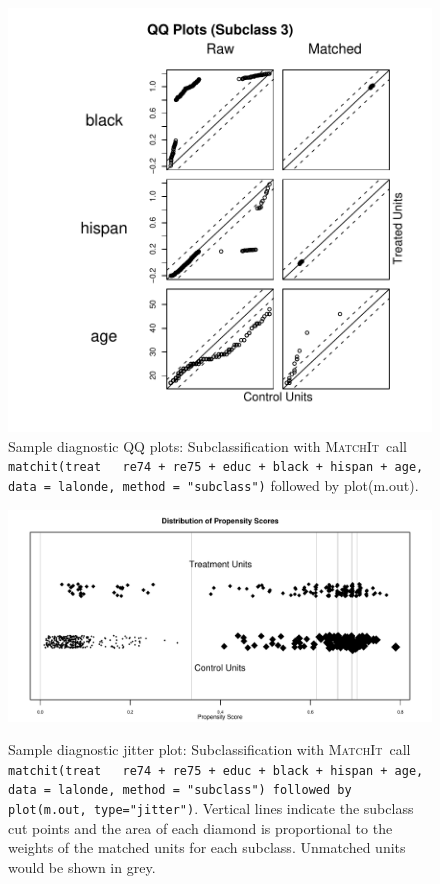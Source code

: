 \documentclass[oneside,letterpaper,titlepage]{article}
\newcommand{\MatchIt}{\textsc{MatchIt}}
\begin{document}
\begin{enumerate}
\begin{figure}[tbp]
\begin{center}
    \includegraphics[scale=.25]{figs/qqplotsub2}
    \hfill
\caption{Sample diagnostic QQ plots: Subclassification with
      \MatchIt\ call \texttt{matchit(treat ~ re74 + re75 + educ +
        black + hispan + age, data = lalonde, method = "subclass")} followed by plot(m.out).}
\label{diagqqsub}
\end{center}
\end{figure}

\begin{figure}[tbp]
  \begin{center}
    {\includegraphics[scale=0.5]{figs/jitterplotsub}}
    \hfill
\caption{Sample diagnostic jitter plot: Subclassification with
      \MatchIt\ call \texttt{matchit(treat ~ re74 + re75 + educ +
        black + hispan + age, data = lalonde, method = "subclass") followed by plot(m.out, type="jitter")}.
      Vertical lines indicate the subclass cut points and the area of
      each diamond is proportional to the weights of the matched units
      for each subclass.  Unmatched units would be shown in grey.}
\label{diagjittersub}
\end{center}
\end{figure}


\end{enumerate}
\end{document}
